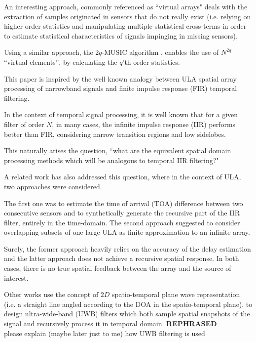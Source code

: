 \par An interesting approach, commonly referenced as ``virtual arrays" \cite{Pal2010NestedFreedom,Chevalier2005OnProcessing,Mendel1999ApplicationsProcessing} deals with the extraction of samples originated in sensors that do not really exist (i.e. relying on higher order statistics and manipulating multiple statistical cross-terms in order to estimate statistical characteristics of signals impinging in missing sensors). 
\par Using a similar approach, the $2q$-MUSIC algorithm \cite{Chevalier2006High-resolutionAlgorithm}, enables the use of $N^{2q}$ ``virtual elements'', by calculating the $q$'th order statistics.
\par This paper is inspired by the well known \cite{VanVeenBeamforming:Filtering} analogy between ULA spatial array processing of narrowband signals and finite impulse response (FIR) temporal filtering. 
\par In the context of temporal signal processing, it is well known that for a given filter of order $N$, in many cases, the infinite impulse response (IIR) performs better than FIR, considering narrow transition regions and low sidelobes.
\par This naturally arises the question, ``what are the equivalent spatial domain processing methods which will be analogous to temporal IIR filtering?" 
\par A related work \cite{Wen2013ExtendingStructure} has also addressed this question, where in the context of ULA, two approaches were considered.
\par The first one was to estimate the time of arrival (TOA) difference between two consecutive sensors and to synthetically generate the recursive part of the IIR filter, entirely in the time-domain. The second approach suggested to consider overlapping subsets of one large ULA as finite approximation to an infinite array. 
\par Surely, the former approach heavily relies on the accuracy of the delay estimation and the latter approach does not achieve a recursive spatial response. In both cases, there is no true spatial feedback between the array and the source of interest.
\par Other works \cite{Madanayake2008AFilters,Madanayake2008ABeamformer} use the concept of $2D$ spatio-temporal plane wave representation (i.e. a straight line angled according to the DOA in the spatio-temporal plane), to design ultra-wide-band (UWB) filters \cite{L.Bruton1983HighlyPlanes} which both sample spatial snapshots of the signal and recursively process it in temporal domain.  {\textbf{REPHRASED}\\please explain (maybe later just to me) how UWB filtering is used}
